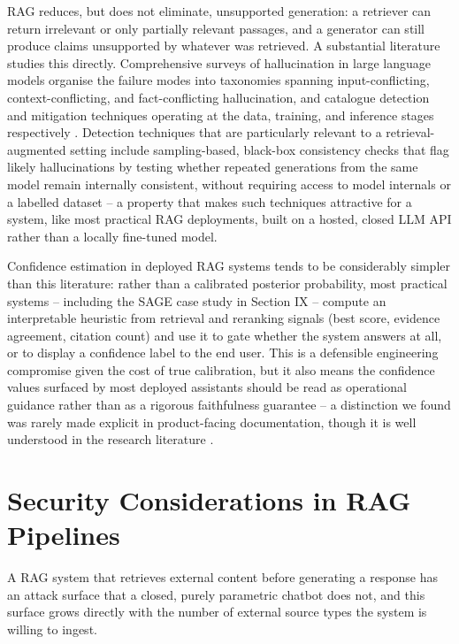 \documentclass[conference]{IEEEtran}
\begin{document}
RAG reduces, but does not eliminate, unsupported generation: a retriever
can return irrelevant or only partially relevant passages, and a
generator can still produce claims unsupported by whatever was retrieved.
A substantial literature studies this directly. Comprehensive surveys of
hallucination in large language models organise the failure modes into
taxonomies spanning input-conflicting, context-conflicting, and
fact-conflicting hallucination, and catalogue detection and mitigation
techniques operating at the data, training, and inference stages
respectively \cite{huang2024hallucination}. Detection techniques that are
particularly relevant to a retrieval-augmented setting include
sampling-based, black-box consistency checks that flag likely
hallucinations by testing whether repeated generations from the same
model remain internally consistent, without requiring access to model
internals or a labelled dataset -- a property that makes such techniques
attractive for a system, like most practical RAG deployments, built on a
hosted, closed LLM API rather than a locally fine-tuned model.

Confidence estimation in deployed RAG systems tends to be considerably
simpler than this literature: rather than a calibrated posterior
probability, most practical systems -- including the SAGE case study in
Section IX -- compute an interpretable heuristic from retrieval and
reranking signals (best score, evidence agreement, citation count) and
use it to gate whether the system answers at all, or to display a
confidence label to the end user. This is a defensible engineering
compromise given the cost of true calibration, but it also means the
confidence values surfaced by most deployed assistants should be read as
operational guidance rather than as a rigorous faithfulness guarantee --
a distinction we found was rarely made explicit in product-facing
documentation, though it is well understood in the research literature
\cite{huang2024hallucination}.

\section{Security Considerations in RAG Pipelines}

A RAG system that retrieves external content before generating a
response has an attack surface that a closed, purely parametric chatbot
does not, and this surface grows directly with the number of external
source types the system is willing to ingest.
\end{document}
